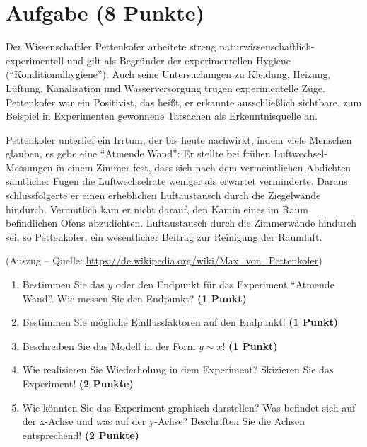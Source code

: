 \documentclass[a4paper, 10pt]{scrartcl}\usepackage[]{graphicx}\usepackage[]{xcolor}
\begin{document}
\section{Aufgabe \hfill (8 Punkte)}

Der Wissenschaftler Pettenkofer arbeitete streng naturwissenschaftlich-experimentell und gilt
als Begr{\"u}nder der experimentellen Hygiene (``Konditionalhygiene''). Auch
seine Untersuchungen zu Kleidung, Heizung, L{\"u}ftung, Kanalisation und
Wasserversorgung trugen experimentelle Z{\"u}ge. Pettenkofer war ein Positivist, das hei{\ss}t, er erkannte ausschlie{\ss}lich
sichtbare, zum Beispiel in Experimenten gewonnene Tatsachen als
Erkenntnisquelle an.

\begin{shaded}
  Pettenkofer unterlief ein Irrtum, der bis heute
  nachwirkt, indem viele Menschen glauben, es gebe eine ``Atmende Wand'':
  Er stellte bei fr{\"u}hen Luftwechsel-Messungen in einem Zimmer fest, dass
  sich nach dem vermeintlichen Abdichten s{\"a}mtlicher Fugen die
  Luftwechselrate weniger als erwartet verminderte. Daraus schlussfolgerte
  er einen erheblichen Luftaustausch durch die Ziegelw{\"a}nde
  hindurch. Vermutlich kam er nicht darauf, den Kamin eines im Raum
  befindlichen Ofens abzudichten. Luftaustausch durch die Zimmerw{\"a}nde
  hindurch sei, so Pettenkofer, ein wesentlicher Beitrag zur Reinigung der
  Raumluft.
\end{shaded}

(Auszug -- Quelle: \url{https://de.wikipedia.org/wiki/Max_von_Pettenkofer})

\begin{enumerate}
\item Bestimmen Sie das $y$ oder den Endpunkt f{\"u}r das Experiment ``Atmende Wand''. Wie
  messen Sie den Endpunkt? \textbf{(1 Punkt)}
\item Bestimmen Sie m{\"o}gliche Einflussfaktoren auf den Endpunkt! \textbf{(1 Punkt)}
\item Beschreiben Sie das Modell in der Form $y \sim x$! \textbf{(1 Punkt)}
\item Wie realisieren Sie Wiederholung in
  dem Experiment? Skizieren Sie das Experiment! \textbf{(2 Punkte)}
\item Wie k{\"o}nnten Sie das Experiment graphisch darstellen? Was befindet
  sich auf der x-Achse und was auf der y-Achse? Beschriften Sie die Achsen entsprechend!
  \textbf{(2 Punkte)}
\end{enumerate}
 
\clearpage
\end{document}
